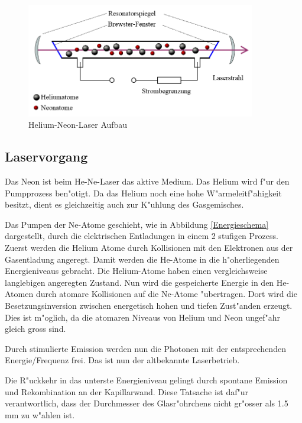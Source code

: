 \begin{refsection}
\begin{figure}
\centering
\includegraphics[width = 10cm]{laser/bilder/Laserschema.png}
\caption{Helium-Neon-Laser Aufbau \cite{He-Ne-Laser-Aufbau}}
\label{HeNeLaserschema}
\end{figure}


\subsection{Laservorgang}
Das Neon ist beim He-Ne-Laser das aktive Medium. Das Helium wird f"ur den 
Pumpprozess ben"otigt. 
Da das Helium noch eine hohe W"armeleitf"ahigkeit besitzt, dient es 
gleichzeitig auch zur K"uhlung des Gasgemisches.

Das Pumpen der Ne-Atome geschieht, wie in Abbildung \ref{Energieschema} 
dargestellt, durch die elektrischen Entladungen in einem 2 stufigen Prozess. 
Zuerst werden die Helium Atome durch Kollisionen mit den Elektronen aus der 
Gasentladung angeregt. Damit werden die He-Atome in die h"oherliegenden 
Energieniveaus gebracht.
Die Helium-Atome haben einen vergleichsweise langlebigen angeregten Zustand. 
Nun wird die gespeicherte Energie in den He-Atomen durch atomare Kollisionen 
auf die Ne-Atome "ubertragen. Dort wird die Besetzungsinversion zwischen 
energetisch hohen und tiefen Zust"anden erzeugt. Dies ist m"oglich, da die 
atomaren Niveaus von Helium und Neon ungef"ahr gleich gross sind.

Durch stimulierte Emission werden nun die Photonen mit der entsprechenden 
Energie/Frequenz frei. Das ist nun der altbekannte Laserbetrieb.

Die R"uckkehr in das unterste Energieniveau  gelingt durch spontane Emission 
und Rekombination an der Kapillarwand. Diese Tatsache ist daf"ur 
verantwortlich, dass der Durchmesser des Glasr"ohrchens nicht gr"osser als 1.5 
mm zu w"ahlen ist. 



\end{refsection}

